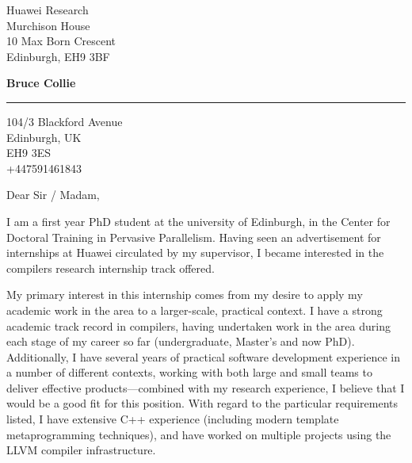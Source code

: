 \documentclass[11pt]{letter} %
\begin{document}

\begin{letter}{ Huawei Research \\
Murchison House \\
10 Max Born Crescent \\
Edinburgh, EH9 3BF} 


\begin{center}
\large\bf Bruce Collie \\ %
\vspace{20pt} \hrule height 1pt %
104/3 Blackford Avenue \\ Edinburgh, UK \\ EH9 3ES \\ +447591461843
\end{center} 

\signature{Bruce Collie} %


\opening{Dear Sir / Madam,} 

I am a first year PhD student at the university of Edinburgh, in the Center for
Doctoral Training in Pervasive Parallelism. Having seen an advertisement for
internships at Huawei circulated by my supervisor, I became interested in the
compilers research internship track offered.

My primary interest in this internship comes from my desire to apply my academic
work in the area to a larger-scale, practical context. I have a strong academic
track record in compilers, having undertaken work in the area during each stage
of my career so far (undergraduate, Master's and now PhD). Additionally, I have
several years of practical software development experience in a number of
different contexts, working with both large and small teams to deliver effective
products---combined with my research experience, I believe that I would be a
good fit for this position. With regard to the particular requirements listed, I
have extensive C++ experience (including modern template metaprogramming
techniques), and have worked on multiple projects using the LLVM compiler
infrastructure.


\end{letter}
\end{document}
